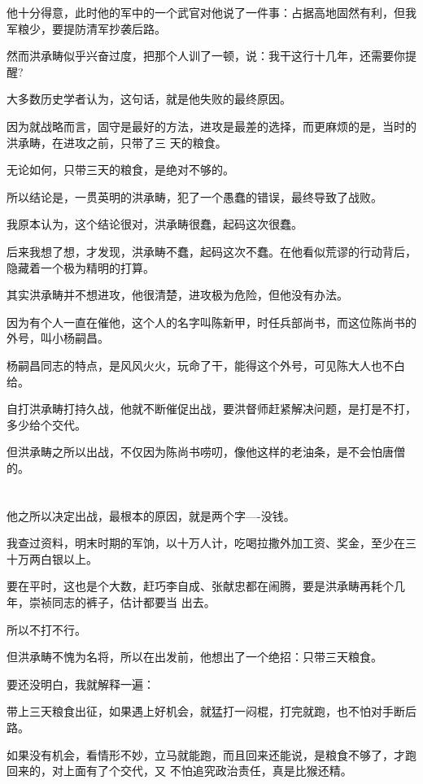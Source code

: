 \documentclass[11pt,a4paper,onecolumn]{article}
\begin{document}
他十分得意，此时他的军中的一个武官对他说了一件事：占据高地固然有利，但我军粮少，要提防清军抄袭后路。

然而洪承畴似乎兴奋过度，把那个人训了一顿，说：我干这行十几年，还需要你提醒?

大多数历史学者认为，这句话，就是他失败的最终原因。

因为就战略而言，固守是最好的方法，进攻是最差的选择，而更麻烦的是，当时的洪承畴，在进攻之前，只带了三
天的粮食。

无论如何，只带三天的粮食，是绝对不够的。

所以结论是，一贯英明的洪承畴，犯了一个愚蠢的错误，最终导致了战败。

我原本认为，这个结论很对，洪承畴很蠢，起码这次很蠢。

后来我想了想，才发现，洪承畴不蠢，起码这次不蠢。在他看似荒谬的行动背后，隐藏着一个极为精明的打算。

其实洪承畴并不想进攻，他很清楚，进攻极为危险，但他没有办法。

因为有个人一直在催他，这个人的名字叫陈新甲，时任兵部尚书，而这位陈尚书的外号，叫小杨嗣昌。

杨嗣昌同志的特点，是风风火火，玩命了干，能得这个外号，可见陈大人也不白给。

自打洪承畴打持久战，他就不断催促出战，要洪督师赶紧解决问题，是打是不打，多少给个交代。

但洪承畴之所以出战，不仅因为陈尚书唠叨，像他这样的老油条，是不会怕唐僧的。

\section[\thesection]{}

他之所以决定出战，最根本的原因，就是两个字----没钱。

我查过资料，明末时期的军饷，以十万人计，吃喝拉撒外加工资、奖金，至少在三十万两白银以上。

要在平时，这也是个大数，赶巧李自成、张献忠都在闹腾，要是洪承畴再耗个几年，崇祯同志的裤子，估计都要当
出去。

所以不打不行。

但洪承畴不愧为名将，所以在出发前，他想出了一个绝招：只带三天粮食。

要还没明白，我就解释一遍：

带上三天粮食出征，如果遇上好机会，就猛打一闷棍，打完就跑，也不怕对手断后路。

如果没有机会，看情形不妙，立马就能跑，而且回来还能说，是粮食不够了，才跑回来的，对上面有了个交代，又
不怕追究政治责任，真是比猴还精。
\end{document}
